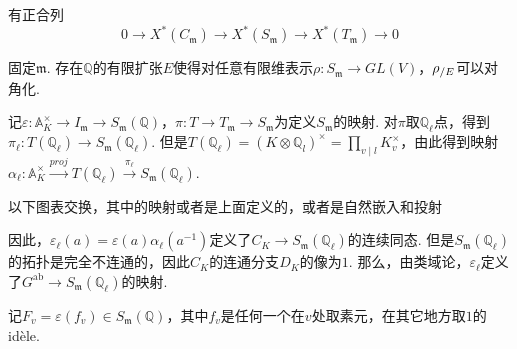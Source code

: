 \begin{cprop}
    有正合列
    \begin{equation}
        0 \to X^{*}(C_{\mathfrak{m}}) \to X^{*}(S_{\mathfrak{m}}) \to X^{*}(T_{\mathfrak{m}}) \to 0
    \end{equation}
\end{cprop}

\begin{cprop}
    固定$\mathfrak{m}$. 存在$\mathbb{Q}$的有限扩张$E$使得对任意有限维表示$\rho:S_{\mathfrak{m}}\to GL(V)$，${\rho}_{/E}$可以对角化. \label{reps::split_finite}
\end{cprop}


记$\varepsilon : \mathbb{A}_K^{\times} \to I_{\mathfrak{m}}\to S_{\mathfrak{m}}(\mathbb{Q})$，$\pi: T \to T_{\mathfrak{m}}\to S_{\mathfrak{m}}$为定义$S_{\mathfrak{m}}$的映射. 对$\pi$取$\mathbb{Q}_{\ell}$点，得到$\pi_{\ell} : T(\mathbb{Q}_{\ell}) \to S_{\mathfrak{m}}(\mathbb{Q}_{\ell})$. 但是$T(\mathbb{Q}_{\ell}) = (K\otimes \mathbb{Q}_l)^{\times} = \prod_{v\mid l} K_v^{\times}$，由此得到映射$\alpha_{\ell} : \mathbb{A}_K^{\times} \xrightarrow{proj} T(\mathbb{Q}_{\ell}) \xrightarrow{\pi_{\ell}} S_{\mathfrak{m}}(\mathbb{Q}_{\ell})$.

\begin{clem}
    以下图表交换，其中的映射或者是上面定义的，或者是自然嵌入和投射
    \begin{figure}[H]
        \centering
    \end{figure}
\end{clem}

因此，$\varepsilon_{\ell}(a) = \varepsilon(a) \alpha_{\ell}(a^{-1})$定义了$C_K \to S_{\mathfrak{m}}(\mathbb{Q}_{\ell})$的连续同态. 但是$S_{\mathfrak{m}}(\mathbb{Q}_{\ell})$的拓扑是完全不连通的，因此$C_K$的连通分支$D_K$的像为$1$. 那么，由类域论，$\varepsilon_{\ell}$定义了$G^{\mathrm{ab}}\to S_{\mathfrak{m}}(\mathbb{Q}_{\ell})$的映射.

记$F_v = \varepsilon(f_v) \in S_{\mathfrak{m}}(\mathbb{Q})$，其中$f_v$是任何一个在$v$处取素元，在其它地方取$1$的idèle.

